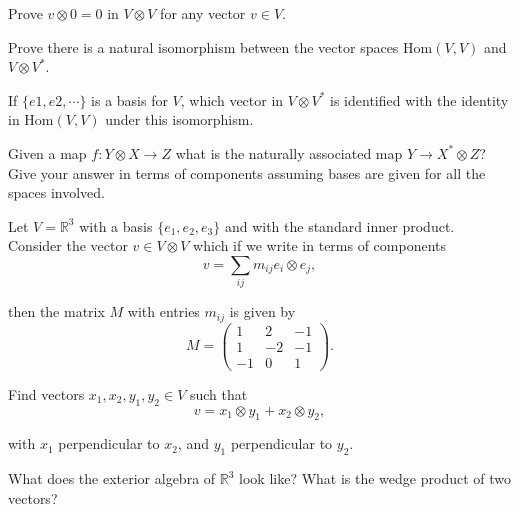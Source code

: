   \begin{exercise} 
    Prove $v \otimes 0 = 0$ in $V \otimes V$ for any vector $v \in V$.
  \end{exercise}

  \begin{exercise} 
    Prove there is a natural isomorphism between the vector spaces $\text{Hom}(V,V)$ and $V \otimes V^*$.
  \end{exercise}

  \begin{exercise} 
    If $\{e1, e2, \cdots\}$ is a basis for $V$, which vector in $V \otimes V^*$ is identified with the identity in $\text{Hom}(V,V)$ under this isomorphism.
  \end{exercise}

  \begin{exercise} 
    Given a map $f : Y \otimes X \to Z$ what is the naturally associated map $Y \to X^* \otimes Z$? Give your answer in terms of components assuming bases are given for all the spaces involved.
  \end{exercise}

  \begin{exercise} 
    Let $V = \mathbb{R}^3$ with a basis $\{e_1, e_2, e_3\}$ and with the standard inner product. Consider the vector $v \in V \otimes V$ which if we write in terms of components
    \[v = \sum_{ij} m_{ij}e_i \otimes e_j,\]
    
    then the matrix $M$ with entries $m_{ij}$ is given by
    \[M = \begin{pmatrix} 1 & 2 & -1 \\ 1 & -2 & -1 \\ -1 & 0 & 1 \end{pmatrix}.\]
    
    Find vectors $x_1, x_2, y_1, y_2 \in V$ such that
    \[v = x_1 \otimes y_1 + x_2 \otimes y_2,\]
    
    with $x_1$ perpendicular to $x_2$, and $y_1$ perpendicular to $y_2$.
  \end{exercise}

  \begin{exercise} 
    What does the exterior algebra of $\mathbb{R}^3$ look like? What is the wedge product of two vectors?
  \end{exercise}

